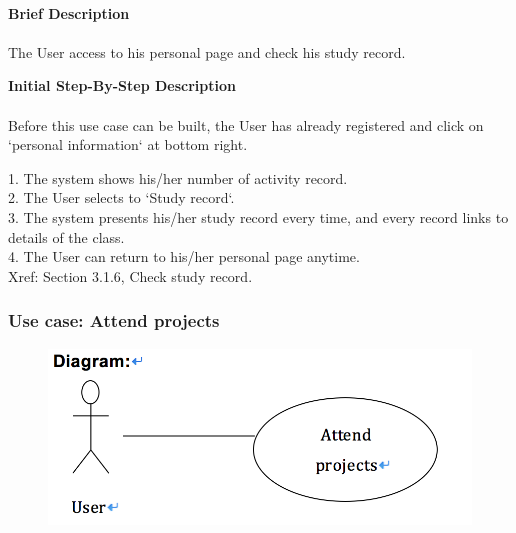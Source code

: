 \documentclass[12pt]{report}
\begin{document}
\paragraph{}
\begin{flushleft}
\textbf{Brief Description }
\paragraph{}
The User access to his personal page and check his study record.\\

\begin{flushleft}
\textbf{Initial Step-By-Step Description }
\paragraph{}
Before this use case can be built, the User has already registered and click on `personal information` at bottom right.

\begin{flushleft}
1.	The system shows his/her number of activity record. \\
2.	The User selects to `Study record`. \\
3.	The system presents his/her study record every time, and every record links to details of the class. \\
4.	The User can return to his/her personal page anytime. \\
Xref: Section 3.1.6, Check study record.
\end{flushleft}
\end{flushleft}
\end{flushleft}


\newpage
\subsubsection{Use case:  Attend projects }

\begin{figure}[!htb]
  \includegraphics{7.PNG}
\end{figure}
\end{document}
